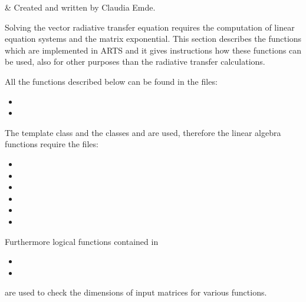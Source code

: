 \label{sec:lin_alg}

 & Created and written by Claudia Emde.\\
\stophistory

%
%

Solving the vector radiative transfer equation requires the
computation of linear equation systems and the matrix
exponential. This section describes the functions which are implemented
in ARTS and it gives instructions how these functions can be used, also
for other purposes than the radiative transfer calculations.

\label{sec:lin_alg:files}

All the functions described below can be found in the files:
\begin{itemize}
\item {}
\item {}
\end{itemize}
The template class  and the classes  and
 are used, therefore the linear algebra functions require
the files:
\begin{itemize}
\item {}
\item {}
\item {}
\item {}
\item {}
\item {}
\end{itemize}
Furthermore logical functions contained in
\begin{itemize}
\item {}
\item {}
\end{itemize}
are used to check the dimensions of input matrices for various functions.


\label{sec:lin_alg:lineqsys}


